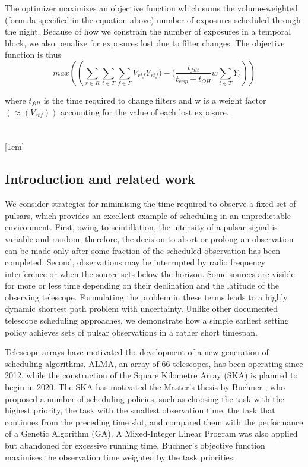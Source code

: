 \documentclass{article}
\begin{document}
The optimizer maximizes an objective function which sums
the volume-weighted (formula specified in the equation above) number of exposures
scheduled through the night. Because of how we constrain the
number of exposures in a temporal block, we also
penalize for exposures lost due to filter changes. The objective
function is thus
\[max\left(\left(\sum_{r \in R}\sum_{t \in T}\sum_{f \in F}V_{rtf}Y_{rtf}) - (\frac{t_{filt}}{t_{exp}+t_{OH}}w\sum_{t \in T}Y_s\right)\right)\]

where \(t_{filt}\) is the time required to change filters and w is a weight
factor \((\approx(V_{rtf}))\) accounting for the value of each lost
exposure.

\section*{\cite{moser2018dispatch} }

[1cm]

\subsection*{Introduction and related work}

We consider strategies
for minimising the time required to observe a fixed set of pulsars, which provides
an excellent example of scheduling in an unpredictable environment. First, owing to
scintillation, the intensity of a pulsar signal is variable and random; therefore, the
decision to abort or prolong an observation can be made only after some fraction of
the scheduled observation has been completed. Second, observations may be interrupted by 
radio frequency interference or when the source sets below the horizon.
Some sources are visible for more or less time depending on their declination and the
latitude of the observing telescope. Formulating the problem in these terms leads to
a highly dynamic shortest path problem with uncertainty. Unlike other documented
telescope scheduling approaches, we demonstrate how a simple earliest setting policy
achieves sets of pulsar observations in a rather short timespan.

Telescope arrays have motivated the development of a new generation of scheduling algorithms. 
ALMA, an array of 66 telescopes, has been operating since 2012,
while the construction of the Square Kilometre Array (SKA) is planned to begin in
2020. The SKA has motivated the Master’s thesis by Buchner \cite{buchner2011dynamic}, who proposed a
number of scheduling policies, such as choosing the task with the highest priority, the
task with the smallest observation time, the task that continues from the preceding
time slot, and compared them with the performance of a Genetic Algorithm (GA). A
Mixed-Integer Linear Program was also applied but abandoned for excessive running
time. Buchner’s objective function maximises the observation time weighted by the
task priorities.
\end{document}
